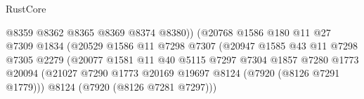 \begin{lexlean}{RustCore}
\begin{coremodule}
                                                  @8359
                                                  @8362
                                                  @8365
                                                  @8369
                                                  @8374
                                                  @8380))
                                              (@20768
                                                @1586
                                                @180
                                                @11
                                                @27
                                                @7309
                                                @1834
                                                (@20529
                                                  @1586
                                                  @11
                                                  @7298
                                                  @7307
                                                  (@20947
                                                    @1585
                                                    @43
                                                    @11
                                                    @7298
                                                    @7305
                                                    @2279
                                                    (@20077
                                                      @1581
                                                      @11
                                                      @40
                                                      @5115
                                                      @7297
                                                      @7304
                                                      @1857
                                                      @7280
                                                      @1773
                                                      @20094
                                                      (@21027
                                                        @7290
                                                        @1773
                                                        @20169
                                                        @19697
                                                        @8124
                                                        (@7920 (@8126 @7291 @1779)))
                                                      @8124
                                                      (@7920 (@8126 @7281 @7297)))

\end{coremodule}
\end{lexlean}
